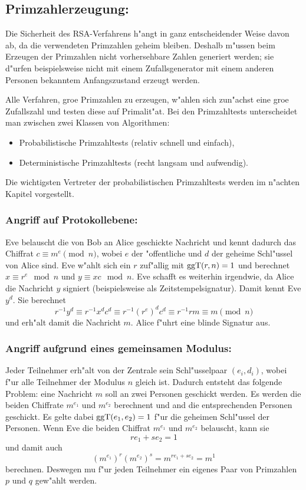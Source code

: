      \subsection*{Primzahlerzeugung:}
     Die Sicherheit des RSA-Verfahrens h"angt in ganz entscheidender Weise 
     davon ab, da\3 die verwendeten Primzahlen geheim bleiben. 
     Deshalb m"ussen beim Erzeugen der Primzahlen nicht vorhersehbare 
     Zahlen generiert werden; sie d"urfen beispielsweise nicht mit einem 
     Zufallsgenerator mit einem anderen Personen bekanntem Anfangszustand
     erzeugt werden.

     Alle Verfahren, gro\3e Primzahlen zu erzeugen, w"ahlen sich zun"achst eine gro\3e 
     Zufallszahl und testen diese auf Primalit"at. Bei den Primzahltests unterscheidet 
     man zwischen zwei Klassen von Algorithmen:
     \begin{itemize}
       \item Probabilistische Primzahltests (relativ schnell und einfach),
       \item Deterministische Primzahltests (recht langsam und aufwendig).
     \end{itemize}
     Die wichtigsten Vertreter der probabilistischen Primzahltests werden
     im n"achten Kapitel vorgestellt.

     \subsubsection*{Angriff auf Protokollebene:}
     Eve belauscht die von Bob an Alice geschickte Nachricht und kennt 
     dadurch das Chiffrat $c \equiv m^e \pmod n$, wobei $e$ der 
     "offentliche und $d$ der geheime Schl"ussel von Alice sind. 
     Eve w"ahlt sich ein $r$ zuf"allig mit $\mbox{ggT}(r,n)=1$ und 
     berechnet $x \equiv r^e \mod n$ und $y \equiv x c \mod n$. 
     Eve schafft es weiterhin irgendwie, da\3 Alice die Nachricht 
     $y$ signiert (beispielsweise als Zeitstempelsignatur). Damit 
     kennt Eve $y^d$. Sie berechnet 
     $$r^{-1}y^d \equiv r^{-1}x^d c^d \equiv r^{-1}(r^e)^d c^d \equiv r^{-1} r m \equiv m \pmod{n}$$
     und erh"alt damit die Nachricht $m$. Alice f"uhrt eine blinde Signatur aus.

     \subsubsection*{Angriff aufgrund eines gemeinsamen Modulus:}
       Jeder Teilnehmer erh"alt von der Zentrale sein Schl"usselpaar 
       $(e_i, d_i)$, wobei f"ur alle Teilnehmer der Modulus $n$ gleich ist.
       Dadurch entsteht das folgende Problem: eine Nachricht $m$ soll an 
       zwei Personen geschickt werden. Es werden die beiden Chiffrate $m^{e_1}$ 
       und $m^{e_2}$ berechnent und and die entsprechenden Personen 
       geschickt. Es gelte dabei $\mbox{ggT}(e_1,e_2)=1$ f"ur die geheimen 
       Schl"ussel der Personen. Wenn Eve die beiden Chiffrat $m^{e_1}$ 
       und $m^{e_2}$ belauscht, kann sie 
       $$ r e_1 + s e_2 = 1 $$
       und damit auch 
       $$ (m^{e_1})^r (m^{e_2})^s = m^{r e_1 + s e_2} = m^1$$ 
       berechnen. Deswegen mu\3 f"ur jeden Teilnehmer ein eigenes 
       Paar von Primzahlen $p$ und $q$ gew"ahlt werden.
